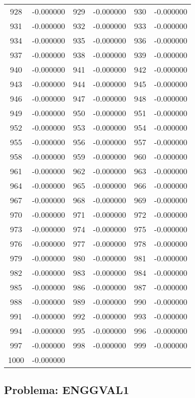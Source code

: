 \documentclass[12pt]{article}
\begin{document}
\begin{longtable}{@{}cc|cc|cc@{}}
928 & -0.000000 & 929 & -0.000000 & 930 & -0.000000 \\
931 & -0.000000 & 932 & -0.000000 & 933 & -0.000000 \\
934 & -0.000000 & 935 & -0.000000 & 936 & -0.000000 \\
937 & -0.000000 & 938 & -0.000000 & 939 & -0.000000 \\
940 & -0.000000 & 941 & -0.000000 & 942 & -0.000000 \\
943 & -0.000000 & 944 & -0.000000 & 945 & -0.000000 \\
946 & -0.000000 & 947 & -0.000000 & 948 & -0.000000 \\
949 & -0.000000 & 950 & -0.000000 & 951 & -0.000000 \\
952 & -0.000000 & 953 & -0.000000 & 954 & -0.000000 \\
955 & -0.000000 & 956 & -0.000000 & 957 & -0.000000 \\
958 & -0.000000 & 959 & -0.000000 & 960 & -0.000000 \\
961 & -0.000000 & 962 & -0.000000 & 963 & -0.000000 \\
964 & -0.000000 & 965 & -0.000000 & 966 & -0.000000 \\
967 & -0.000000 & 968 & -0.000000 & 969 & -0.000000 \\
970 & -0.000000 & 971 & -0.000000 & 972 & -0.000000 \\
973 & -0.000000 & 974 & -0.000000 & 975 & -0.000000 \\
976 & -0.000000 & 977 & -0.000000 & 978 & -0.000000 \\
979 & -0.000000 & 980 & -0.000000 & 981 & -0.000000 \\
982 & -0.000000 & 983 & -0.000000 & 984 & -0.000000 \\
985 & -0.000000 & 986 & -0.000000 & 987 & -0.000000 \\
988 & -0.000000 & 989 & -0.000000 & 990 & -0.000000 \\
991 & -0.000000 & 992 & -0.000000 & 993 & -0.000000 \\
994 & -0.000000 & 995 & -0.000000 & 996 & -0.000000 \\
997 & -0.000000 & 998 & -0.000000 & 999 & -0.000000 \\
1000 & -0.000000 &  &  &  &  \\

\end{longtable}


\newpage            
\subsection{Problema: ENGGVAL1}
\end{document}
